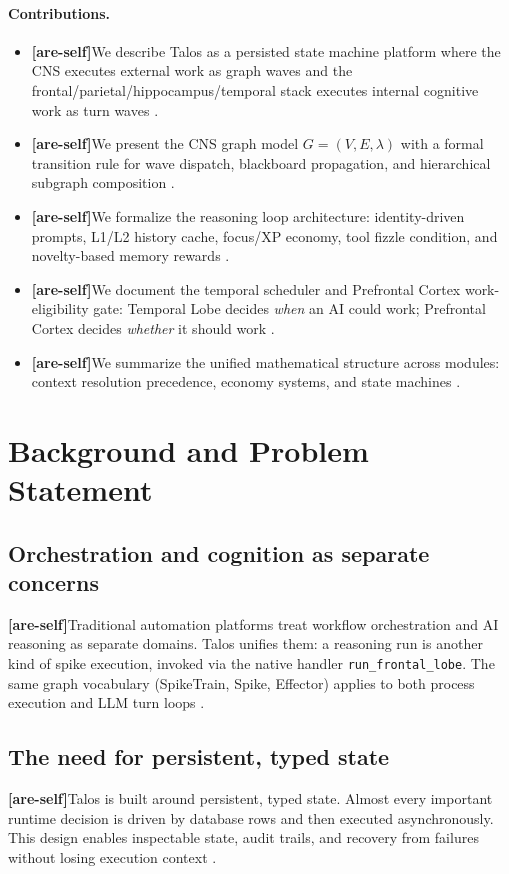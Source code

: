 \documentclass[11pt]{article}
\newcommand{\areself}{\textbf{[are-self]}}
\begin{document}
	\paragraph{Contributions.}
	\label{are-self:contributions}
	\begin{itemize}[leftmargin=1.4em]
		\item \areself We describe Talos as a persisted state machine platform where the CNS executes external work as graph waves and the frontal/parietal/hippocampus/temporal stack executes internal cognitive work as turn waves \cite{talosLiveCodebase}.
		\item \areself We present the CNS graph model $G = (V, E, \lambda)$ with a formal transition rule for wave dispatch, blackboard propagation, and hierarchical subgraph composition \cite{talosCNS,talosCombined}.
		\item \areself We formalize the reasoning loop architecture: identity-driven prompts, L1/L2 history cache, focus/XP economy, tool fizzle condition, and novelty-based memory rewards \cite{talosFrontal,talosParietal,talosHippocampus}.
		\item \areself We document the temporal scheduler and Prefrontal Cortex work-eligibility gate: Temporal Lobe decides \emph{when} an AI could work; Prefrontal Cortex decides \emph{whether} it should work \cite{talosTemporal,talosPFC}.
		\item \areself We summarize the unified mathematical structure across modules: context resolution precedence, economy systems, and state machines \cite{talosCombined}.
	\end{itemize}
	
	\section{Background and Problem Statement}
	\subsection{Orchestration and cognition as separate concerns}
	\areself Traditional automation platforms treat workflow orchestration and AI reasoning as separate domains. Talos unifies them: a reasoning run is another kind of spike execution, invoked via the native handler \texttt{run\_frontal\_lobe}. The same graph vocabulary (SpikeTrain, Spike, Effector) applies to both process execution and LLM turn loops \cite{talosLiveCodebase,talosCNS}.
	
	\subsection{The need for persistent, typed state}
	\areself Talos is built around persistent, typed state. Almost every important runtime decision is driven by database rows and then executed asynchronously. This design enables inspectable state, audit trails, and recovery from failures without losing execution context \cite{talosLiveCodebase}.
	
\end{document}
